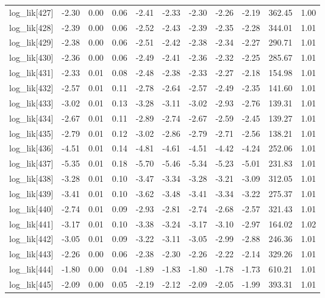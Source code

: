 \begin{table}[ht]
\begin{tabular}{rrrrrrrrrrr}
  log\_lik[427] & -2.30 & 0.00 & 0.06 & -2.41 & -2.33 & -2.30 & -2.26 & -2.19 & 362.45 & 1.00 \\ 
  log\_lik[428] & -2.39 & 0.00 & 0.06 & -2.52 & -2.43 & -2.39 & -2.35 & -2.28 & 344.01 & 1.01 \\ 
  log\_lik[429] & -2.38 & 0.00 & 0.06 & -2.51 & -2.42 & -2.38 & -2.34 & -2.27 & 290.71 & 1.01 \\ 
  log\_lik[430] & -2.36 & 0.00 & 0.06 & -2.49 & -2.41 & -2.36 & -2.32 & -2.25 & 285.67 & 1.01 \\ 
  log\_lik[431] & -2.33 & 0.01 & 0.08 & -2.48 & -2.38 & -2.33 & -2.27 & -2.18 & 154.98 & 1.01 \\ 
  log\_lik[432] & -2.57 & 0.01 & 0.11 & -2.78 & -2.64 & -2.57 & -2.49 & -2.35 & 141.60 & 1.01 \\ 
  log\_lik[433] & -3.02 & 0.01 & 0.13 & -3.28 & -3.11 & -3.02 & -2.93 & -2.76 & 139.31 & 1.01 \\ 
  log\_lik[434] & -2.67 & 0.01 & 0.11 & -2.89 & -2.74 & -2.67 & -2.59 & -2.45 & 139.27 & 1.01 \\ 
  log\_lik[435] & -2.79 & 0.01 & 0.12 & -3.02 & -2.86 & -2.79 & -2.71 & -2.56 & 138.21 & 1.01 \\ 
  log\_lik[436] & -4.51 & 0.01 & 0.14 & -4.81 & -4.61 & -4.51 & -4.42 & -4.24 & 252.06 & 1.01 \\ 
  log\_lik[437] & -5.35 & 0.01 & 0.18 & -5.70 & -5.46 & -5.34 & -5.23 & -5.01 & 231.83 & 1.01 \\ 
  log\_lik[438] & -3.28 & 0.01 & 0.10 & -3.47 & -3.34 & -3.28 & -3.21 & -3.09 & 312.05 & 1.01 \\ 
  log\_lik[439] & -3.41 & 0.01 & 0.10 & -3.62 & -3.48 & -3.41 & -3.34 & -3.22 & 275.37 & 1.01 \\ 
  log\_lik[440] & -2.74 & 0.01 & 0.09 & -2.93 & -2.81 & -2.74 & -2.68 & -2.57 & 321.43 & 1.01 \\ 
  log\_lik[441] & -3.17 & 0.01 & 0.10 & -3.38 & -3.24 & -3.17 & -3.10 & -2.97 & 164.02 & 1.02 \\ 
  log\_lik[442] & -3.05 & 0.01 & 0.09 & -3.22 & -3.11 & -3.05 & -2.99 & -2.88 & 246.36 & 1.01 \\ 
  log\_lik[443] & -2.26 & 0.00 & 0.06 & -2.38 & -2.30 & -2.26 & -2.22 & -2.14 & 329.26 & 1.01 \\ 
  log\_lik[444] & -1.80 & 0.00 & 0.04 & -1.89 & -1.83 & -1.80 & -1.78 & -1.73 & 610.21 & 1.01 \\ 
  log\_lik[445] & -2.09 & 0.00 & 0.05 & -2.19 & -2.12 & -2.09 & -2.05 & -1.99 & 393.31 & 1.01 \\ 

\end{tabular}
\end{table}
